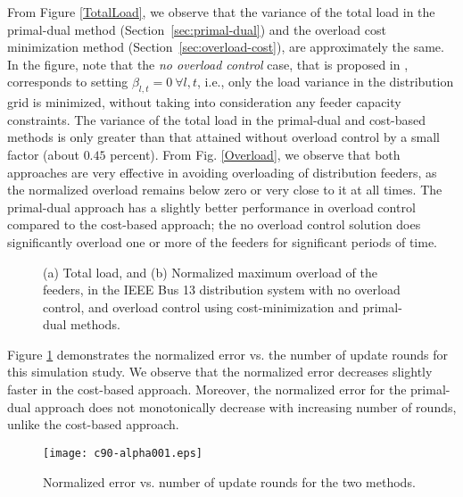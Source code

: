 \documentclass[12pt,draftcls,onecolumn]{IEEEtran}
\begin{document}
From Figure \ref{TotalLoad}, we observe that the variance of the total load in the primal-dual method (Section~\ref{sec:primal-dual}) and the overload cost minimization method (Section~\ref{sec:overload-cost}), are approximately the same. In the figure, note that the \textit{no overload control} case, that is proposed in \cite{GTL13}, corresponds to setting $\beta_{l,t} = 0 \ \forall l, t$, i.e., only the load variance in the distribution grid is minimized, without taking into consideration any feeder capacity constraints. The variance of the total load in the primal-dual and cost-based methods is only greater than that attained without overload control by a small factor (about $0.45$ percent).  From Fig. \ref{Overload}, we observe that both approaches are very effective in avoiding overloading of distribution feeders, as the normalized overload remains below zero or very close to it at all times. The primal-dual approach has a slightly better performance in overload control compared to the cost-based approach; the no overload control solution does significantly overload one or more of the feeders for significant periods of time.\\
\begin{figure}
\centering
{}
\caption{(a) Total load, and (b) Normalized maximum overload of the feeders, in the IEEE Bus 13 distribution system with no overload control, and overload control using cost-minimization and primal-dual methods.}
\vspace{-5mm}
\end{figure}
\indent Figure \ref{NormError} demonstrates the normalized error vs. the number of update rounds for this simulation study. We observe that the normalized error decreases slightly faster in the cost-based approach. Moreover, the normalized error for the primal-dual approach does not monotonically decrease with increasing number of rounds, unlike the cost-based approach.
\begin{figure}
\centering
\texttt{[image: c90-alpha001.eps]}
\caption{Normalized error vs. number of update rounds for the two methods.}
\label{NormError}
\end{figure}
\end{document}
